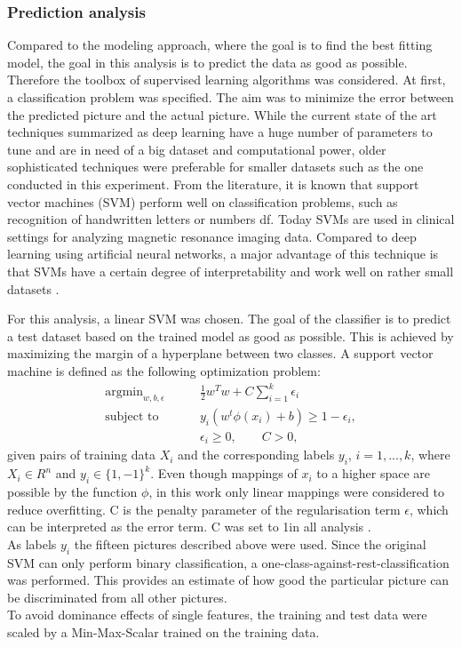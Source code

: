 \documentclass[a4paper,man,natbib,floatsintext]{apa6}
\begin{document}
\subsubsection{Prediction analysis}
Compared to the modeling approach, where the goal is to find the best fitting model, the goal in this analysis is to predict the data as good as possible. Therefore the toolbox of supervised learning algorithms was considered. At first, a classification problem was specified. The aim was to minimize the error between the predicted picture and the actual picture.  While the current state of the art techniques summarized as deep learning have a huge number of parameters to tune and are in need of a big dataset and computational power, older sophisticated techniques were preferable for smaller datasets such as the one conducted in this experiment. From the literature, it is known that support vector machines (SVM) perform well on classification problems, such as recognition of handwritten letters or numbers \citep{Bahlmann2002,Guo2001}df. Today SVMs are used in clinical settings for analyzing magnetic resonance imaging data. Compared to deep learning using artificial neural networks, a major advantage of this technique is that SVMs have a certain degree of interpretability and work well on rather small datasets \citep{Segovia2010}.


For this analysis, a linear SVM was chosen.  The goal of the classifier is to predict a test dataset based on the trained model as good as possible. This is achieved by maximizing the margin of a hyperplane between two classes. A support vector machine is defined as the following optimization problem: 
\begin{align}
\text{argmin}_{w,b,\epsilon} &\qquad \frac{1}{2} w^Tw + C\sum^k_{i=1} \epsilon_i \\
\text{subject to }&\qquad   y_i(w^t\phi(x_i)+b) \geq 1-\epsilon_i, \\ & \qquad \epsilon_i \geq 0, \qquad C>0,
\end{align}
given pairs of training data $X_i$ and the corresponding labels $y_i$, $i=1,...,k$, where $X_i \in R^n$ and $y_i \in \{1,-1\}^k$. Even though mappings of $x_i$ to a higher space are possible by the function $\phi$, in this work only linear mappings were considered to reduce overfitting. C is the penalty parameter of the regularisation term $\epsilon$, which can be interpreted as the error term. C was set to 1in all analysis \citep{Cortes1995}. \\
As labels $y_i$ the fifteen pictures described above were used. Since the original SVM can only perform binary classification, a one-class-against-rest-classification was performed. This provides an estimate of how good the particular picture can be discriminated from all other pictures.\\ %
To avoid dominance effects of single features, the training and test data were scaled by a Min-Max-Scalar trained on the training data.\\
\end{document}
